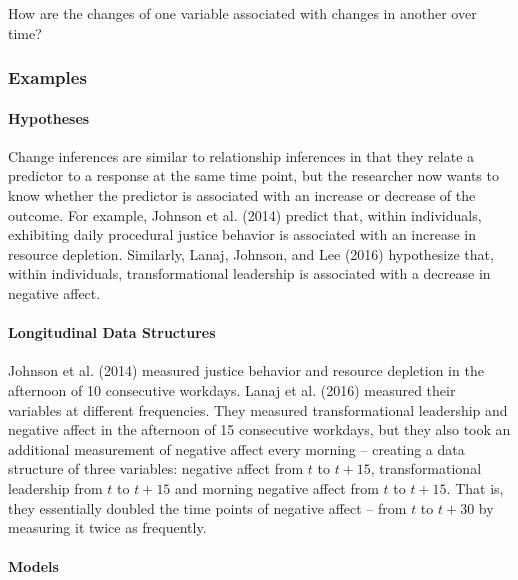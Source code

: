 \documentclass[english,,man]{apa6}
\let\oldparagraph\paragraph
\renewcommand{\paragraph}[1]{\oldparagraph{#1}\mbox{}}
\theoremstyle{definition}
\theoremstyle{definition}
\theoremstyle{definition}
\theoremstyle{remark}
\begin{document}
How are the changes of one variable associated with changes in another
over time?

\hypertarget{examples-5}{%
\subsubsection{Examples}\label{examples-5}}

\hypertarget{hypotheses-6}{%
\paragraph{Hypotheses}\label{hypotheses-6}}

Change inferences are similar to relationship inferences in that they
relate a predictor to a response at the same time point, but the
researcher now wants to know whether the predictor is associated with an
increase or decrease of the outcome. For example, Johnson et al. (2014)
predict that, within individuals, exhibiting daily procedural justice
behavior is associated with an increase in resource depletion.
Similarly, Lanaj, Johnson, and Lee (2016) hypothesize that, within
individuals, transformational leadership is associated with a decrease
in negative affect.

\hypertarget{longitudinal-data-structures-1}{%
\paragraph{Longitudinal Data
Structures}\label{longitudinal-data-structures-1}}

Johnson et al. (2014) measured justice behavior and resource depletion
in the afternoon of 10 consecutive workdays. Lanaj et al. (2016)
measured their variables at different frequencies. They measured
transformational leadership and negative affect in the afternoon of 15
consecutive workdays, but they also took an additional measurement of
negative affect every morning -- creating a data structure of three
variables: negative affect from \(t\) to \(t + 15\), transformational
leadership from \(t\) to \(t + 15\) and morning negative affect from
\(t\) to \(t + 15\). That is, they essentially doubled the time points
of negative affect -- from \(t\) to \(t + 30\) by measuring it twice as
frequently.

\hypertarget{models-6}{%
\paragraph{Models}\label{models-6}}
\end{document}
